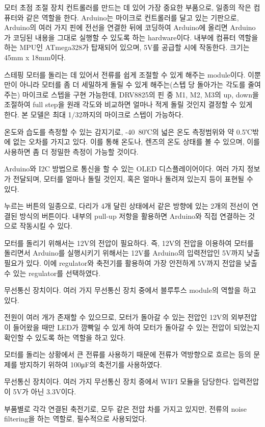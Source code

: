 \begin{description}[font=$\bullet$~\normalfont\scshape\color{red!50!black}]
	\item [ARDUINO NANO] 모터 초점 조절 장치 컨트롤러를 만드는 데 있어 가장 중요한 부품으로, 일종의 작은 컴퓨터와 같은 역할을 한다. Arduino는 마이크로 컨트롤러를 달고 있는 기판으로, Arduino의 여러 가지 핀에 전선을 연결한 뒤에 코딩하여 Arduino에 올리면 Arduino가 코딩된 내용을 그대로 실행할 수 있도록 하는 hardware이다. 내부에 컴퓨터 역할을 하는 MPU인 ATmega328가 탑재되어 있으며, 5V를 공급할 시에 작동한다. 크기는 45mm x 18mm이다.
	\item [DRV8825] 스테핑 모터를 돌리는 데 있어서 전류를 쉽게 조절할 수 있게 해주는 module이다. 이뿐만이 아니라 모터를 좀 더 세밀하게 돌릴 수 있게 해주는(스텝 당 돌아가는 각도를 줄여주는) 마이크로 스텝을 구현 가능한데, DRV8825의 핀 중 M1, M2, M3의 up, down을 조절하여 full step을 원래 각도와 비교하면 얼마나 적게 돌릴 것인지 결정할 수 있게 한다. 본 모델은 최대 1/32까지의 마이크로 스텝이 가능하다.
	\item [DHT22] 온도와 습도를 측정할 수 있는 감지기로, -40~80℃의 넓은 온도 측정범위와 약 0.5℃밖에 없는 오차를 가지고 있다. 이를 통해 온도나, 렌즈의 온도 상태를 볼 수 있으며, 이를 사용하면 좀 더 정밀한 측정이 가능할 것이다.
	\item [0.96" oled screen I2C] Arduino와 I2C 방법으로 통신을 할 수 있는 OLED 디스플레이어이다. 여러 가지 정보가 전달되며, 모터를 얼마나 돌릴 것인지, 혹은 얼마나 돌려져 있는지 등이 표현될 수 있다.
	\item [Apem MJTP1230B 버튼스위치] 누르는 버튼의 일종으로, 다리가 4개 달린 상태에서 같은 방향에 있는 2개의 전선이 연결된 방식의 버튼이다. 내부의 pull-up 저항을 활용하면 Arduino와 직접 연결하는 것으로 작동시킬 수 있다.
	\item [BP5277-90] 모터를 돌리기 위해서는 12V의 전압이 필요하다. 즉, 12V의 전압을 이용하여 모터를 돌리면서 Arduino를 실행시키기 위해서는 12V를 Arduino의 입력전압인 5V까지 낮출 필요가 있다. 이에 regulator와 축전기를 활용하여 가장 안전하게 5V까지 전압을 낮출 수 있는 regulator를 선택하였다.
	\item [HC-06 bluetooth] 무선통신 장치이다. 여러 가지 무선통신 장치 중에서 블루투스 module의 역할을 하고 있다.
	\item [LED 3mm 90', Ohmite OD473JE] 전원이 여러 개가 존재할 수 있으므로, 모터가 돌아갈 수 있는 전압인 12V의 외부전압이 들어왔을 때만 LED가 깜빡일 수 있게 하여 모터가 돌아갈 수 있는 전압이 되었는지 확인할 수 있도록 하는 역할을 하고 있다.
	\item [Panasonic EEA-GA1C100H] 모터를 돌리는 상황에서 큰 전류를 사용하기 때문에 전류가 역방향으로 흐르는 등의 문제를 방지하기 위하여 100μF의 축전기를 사용하였다.
	\item [SparkFun WRL-13678 (ESP8266, ESP01)] 무선통신 장치이다. 여러 가지 무선통신 장치 중에서 WIFI 모듈을 담당한다. 입력전압이 5V가 아닌 3.3V이다.
	\item [Sprague 1C10X7R104K050B] 부품별로 각각 연결된 축전기로, 모두 같은 전압 차를 가지고 있지만, 전류의 noise filtering을 하는 역할로, 필수적으로 사용되었다.


\end{description}

